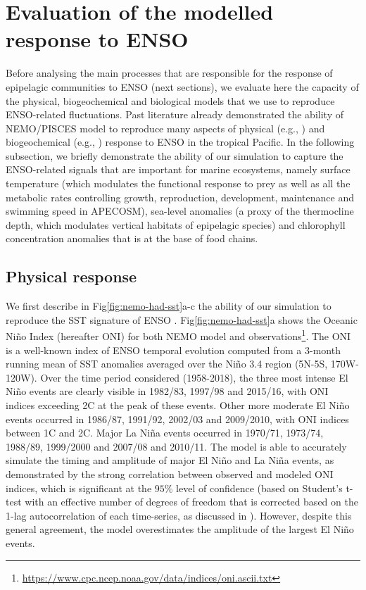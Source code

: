 \section{Evaluation of the modelled response to ENSO}
\label{sec:model-val}

Before analysing the main processes that are responsible for the response of epipelagic communities to ENSO (next sections), we evaluate here the capacity of the physical, biogeochemical and biological models that we use to reproduce ENSO-related fluctuations. Past literature already demonstrated the ability of NEMO/PISCES model to reproduce many aspects of physical (e.g., \citealt{vialardModelStudyOceanic2001, lengaigneOceanResponseMarch2002}) and biogeochemical (e.g., \citealt{ masottiLargescaleShiftsPhytoplankton2011}) response to ENSO in the tropical Pacific. In the following subsection, we briefly demonstrate the ability of our simulation to capture the ENSO-related signals that are important for marine ecosystems, namely surface temperature (which modulates the functional response to prey as well as all the metabolic rates controlling growth, reproduction, development, maintenance and swimming speed in APECOSM), sea-level anomalies (a proxy of the thermocline depth, which modulates vertical habitats of epipelagic species) and chlorophyll concentration anomalies that is at the base of food chains.

\subsection{Physical response}

We first describe in Fig\ref{fig:nemo-had-sst}a-c the ability of our simulation to reproduce the SST signature of ENSO \citep{drushkaProcessesDrivingIntraseasonal2015, puyModulationEquatorialPacific2019, gorguesRevisitingNina19982010, martinezReconstructingGlobalChlorophylla2020}. Fig\ref{fig:nemo-had-sst}a shows the Oceanic Niño Index (hereafter ONI) for both NEMO model and observations\footnote{\url{https://www.cpc.ncep.noaa.gov/data/indices/oni.ascii.txt}}. The ONI is a well-known index of ENSO temporal evolution computed from a 3-month running mean of SST anomalies averaged over the Niño 3.4 region (5N-5S, 170W-120W). Over the time period considered (1958-2018), the three most intense El Niño events are clearly visible in 1982/83, 1997/98 and 2015/16, with ONI indices exceeding 2\degree{}C at the peak of these events. Other more moderate El Niño events occurred in 1986/87, 1991/92, 2002/03 and 2009/2010, with ONI indices between 1\degree{}C and 2\degree{}C. Major La Niña events occurred in 1970/71, 1973/74, 1988/89, 1999/2000 and 2007/08 and 2010/11. The model is able to accurately simulate the timing and amplitude of major El Niño and La Niña events, as demonstrated by the strong correlation between observed and modeled ONI indices, which is significant at the $95\%$ level of confidence (based on Student's t-test with an effective number of degrees of freedom that is corrected based on the 1-lag autocorrelation of each time-series, as discussed in \cite{brethertonEffectiveNumberSpatial1999}). However, despite this general agreement, the model overestimates the amplitude of the largest El Niño events. 

